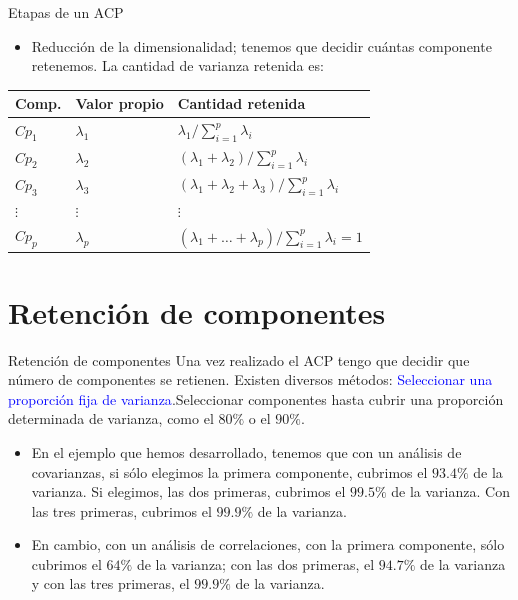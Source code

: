 \documentclass[
  ignorenonframetext,
]{beamer}
\providecommand{\tightlist}{%
  \setlength{\itemsep}{0pt}\setlength{\parskip}{0pt}}
\newcommand\blue[1]{\textcolor{blue}{#1}}
\begin{document}
\begin{frame}{Etapas de un ACP}
\label{etapas-de-un-acp-2}
\begin{itemize}
\tightlist
\item
  Reducción de la dimensionalidad; tenemos que decidir cuántas
  componente retenemos. La cantidad de varianza retenida es:
\end{itemize}

\begin{table}
\centering
\begin{tabular}{|l|l|l|}\hline
Comp. & Valor propio & Cantidad retenida\\\hline
$Cp_1$& $\lambda_1$ & $\lambda_1/\sum_{i=1}^p \lambda_i$\\
$Cp_2 $ & $\lambda_2$ & $(\lambda_1+\lambda_2)/\sum_{i=1}^p \lambda_i$\\
$Cp_3$ & $\lambda_3$ &
$(\lambda_1+\lambda_2+\lambda_3)/\sum_{i=1}^p
\lambda_i$\\ $\vdots$ & $\vdots$ & $\vdots$\\
$Cp_p$ & $\lambda_p$ &
$(\lambda_1+\ldots+\lambda_p)/\sum_{i=1}^p\lambda_i=1$\\\hline
\end{tabular}
\end{table}
\end{frame}

\section{Retención de componentes}\label{retenciuxf3n-de-componentes}

\begin{frame}{Retención de componentes}
\label{retenciuxf3n-de-componentes-1}
Una vez realizado el ACP tengo que decidir que número de componentes se
retienen. Existen diversos métodos:
\blue{Seleccionar una proporción fija de varianza}.Seleccionar
componentes hasta cubrir una proporción determinada de varianza, como el
\(80\%\) o el \(90\%\).

\begin{itemize}
\tightlist
\item
  En el ejemplo que hemos desarrollado, tenemos que con un análisis de
  covarianzas, si sólo elegimos la primera componente, cubrimos el
  \(93.4\%\) de la varianza. Si elegimos, las dos primeras, cubrimos el
  \(99.5\%\) de la varianza. Con las tres primeras, cubrimos el
  \(99.9\%\) de la varianza.
\item
  En cambio, con un análisis de correlaciones, con la primera
  componente, sólo cubrimos el \(64\%\) de la varianza; con las dos
  primeras, el \(94.7\%\) de la varianza y con las tres primeras, el
  \(99.9\%\) de la varianza.
\end{itemize}
\end{frame}
\end{document}
